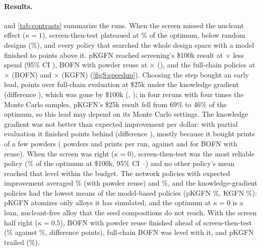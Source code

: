 \documentclass[11pt]{article}
\begin{document}
\paragraph{Results.}  and \cref{tab:contrasts} summarize the
runs. When the screen missed the nucleant effect ($\kappa=1$), screen-then-test
plateaued at \% of the optimum, below random designs
(\%), and every policy that searched the whole design
space with a model finished  to
 points above it. pKGFN reached screening's \$100k result at
$\times$ less spend (95\% CI
), BOFN with powder reuse at
$\times$ (),
and the full-chain policies at $\times$ (BOFN) and
$\times$ (KGFN) (\cref{figS:speedup}). Choosing the
step bought an early lead,  points over full-chain evaluation
at \$25k under the knowledge gradient (difference ), which was
gone by \$100k (, ); in four reruns
with four times the Monte Carlo samples, pKGFN's \$25k result fell from 69\% to
46\% of the optimum, so this lead may depend on its Monte Carlo settings. The knowledge
gradient was not better than expected improvement per dollar: with partial
evaluation it finished  points behind (difference
), mostly
because it bought prints of a few powders ( powders and
 prints per run, against  and
 for BOFN with reuse). When the screen was right
($\kappa=0$), screen-then-test was the most reliable policy
(\% of the optimum at \$100k, 95\% CI
--) and no other policy's mean
reached that level within the budget. The network policies with expected
improvement averaged \% (with powder reuse) and
\%, and the knowledge-gradient policies had the
lowest means of the model-based policies (pKGFN \%, KGFN
\%):
pKGFN atomizes only alloys it has simulated, and the optimum at $\kappa=0$ is a
lean, nucleant-free alloy that the seed compositions do not reach.
With the screen half right ($\kappa=0.5$), BOFN with powder reuse finished ahead
of screen-then-test (\% against
\%, difference 
points), full-chain BOFN was level with it, and pKGFN trailed
(\%).
\end{document}
